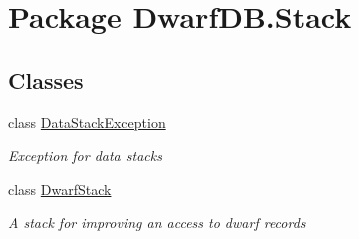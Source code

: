 \hypertarget{namespace_dwarf_d_b_1_1_stack}{\section{Package Dwarf\+D\+B.\+Stack}
\label{namespace_dwarf_d_b_1_1_stack}
}
\subsection*{Classes}
\begin{DoxyCompactItemize}
\item 
class \hyperlink{class_dwarf_d_b_1_1_stack_1_1_data_stack_exception}{Data\+Stack\+Exception}
\begin{DoxyCompactList}\small\item\em Exception for data stacks \end{DoxyCompactList}\item 
class \hyperlink{class_dwarf_d_b_1_1_stack_1_1_dwarf_stack}{Dwarf\+Stack}
\begin{DoxyCompactList}\small\item\em A stack for improving an access to dwarf records \end{DoxyCompactList}\end{DoxyCompactItemize}
